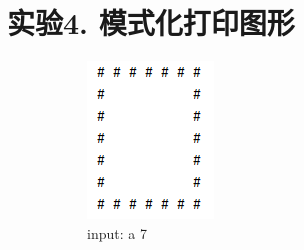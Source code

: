 \section{实验4. 模式化打印图形}
    
    \begin{figure}[H]
        \centering
        \begin{subfigure}{0.19\linewidth}
            \centering
            \includegraphics[width=1\linewidth]{../pic/4/4.a.png}
            \caption{input: a 7}
        \end{subfigure}
        \begin{subfigure}{0.19\linewidth}
            \centering

\end{subfigure}
\end{figure}
